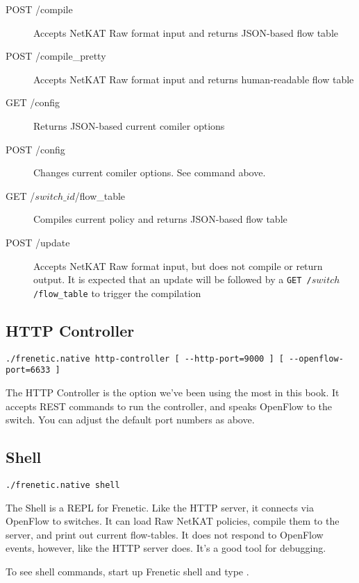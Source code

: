 \begin{description}
\item[POST /compile] Accepts NetKAT Raw format input and returns JSON-based flow table   
\item[POST /compile\_pretty] Accepts NetKAT Raw format input and returns human-readable flow table   
\item[GET /config] Returns JSON-based current comiler options   
\item[POST /config] Changes current comiler options.  See command  above.
\item[GET /$switch\_id$/flow\_table] Compiles current policy and returns JSON-based flow table   
\item[POST /update] Accepts NetKAT Raw format input, but does not compile or return output.  It is expected
that an update will be followed by a \texttt{GET /$switch$/flow\_table} to trigger the compilation   
\end{description}

\subsection{HTTP Controller}

\begin{verbatim}
./frenetic.native http-controller [ --http-port=9000 ] [ --openflow-port=6633 ]
\end{verbatim}

The HTTP Controller is the option we've been using the most in this book.  It accepts REST commands
to run the controller, and speaks OpenFlow to the switch.  You can adjust the default port numbers as
above.  

\subsection{Shell}

\begin{verbatim}
./frenetic.native shell 
\end{verbatim}

The Shell is a REPL for Frenetic.  Like the HTTP server, it connects via OpenFlow to switches.  
It can load Raw NetKAT policies, compile them to the server, and print out current flow-tables.  
It does not respond to OpenFlow events, however, like the HTTP server does.  It's a good tool for debugging.

To see shell commands, start up Frenetic shell and type .